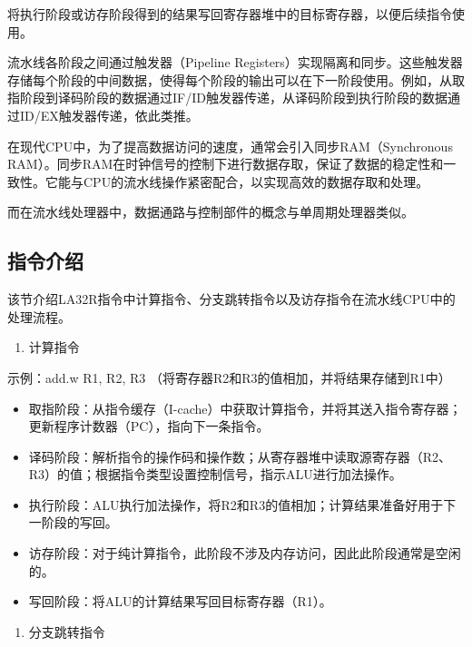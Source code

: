将执行阶段或访存阶段得到的结果写回寄存器堆中的目标寄存器，以便后续指令使用。

流水线各阶段之间通过触发器（Pipeline Registers）实现隔离和同步。这些触发器存储每个阶段的中间数据，使得每个阶段的输出可以在下一阶段使用。例如，从取指阶段到译码阶段的数据通过IF/ID触发器传递，从译码阶段到执行阶段的数据通过ID/EX触发器传递，依此类推。

在现代CPU中，为了提高数据访问的速度，通常会引入同步RAM（Synchronous RAM）。同步RAM在时钟信号的控制下进行数据存取，保证了数据的稳定性和一致性。它能与CPU的流水线操作紧密配合，以实现高效的数据存取和处理。

而在流水线处理器中，数据通路与控制部件的概念与单周期处理器类似。

\subsection{指令介绍}\label{sec:05-simple-cpu-009}

该节介绍LA32R指令中计算指令、分支跳转指令以及访存指令在流水线CPU中的处理流程。

\begin{enumerate}
\def\labelenumi{\arabic{enumi}.}
\tightlist
\item
  计算指令
\end{enumerate}

示例：add.w R1, R2, R3 （将寄存器R2和R3的值相加，并将结果存储到R1中）

\begin{itemize}
\item
  取指阶段：从指令缓存（I-cache）中获取计算指令，并将其送入指令寄存器；更新程序计数器（PC），指向下一条指令。
\item
  译码阶段：解析指令的操作码和操作数；从寄存器堆中读取源寄存器（R2、R3）的值；根据指令类型设置控制信号，指示ALU进行加法操作。
\item
  执行阶段：ALU执行加法操作，将R2和R3的值相加；计算结果准备好用于下一阶段的写回。
\item
  访存阶段：对于纯计算指令，此阶段不涉及内存访问，因此此阶段通常是空闲的。
\item
  写回阶段：将ALU的计算结果写回目标寄存器（R1）。
\end{itemize}

\begin{enumerate}
\def\labelenumi{\arabic{enumi}.}
\setcounter{enumi}{1}
\tightlist
\item
  分支跳转指令
\end{enumerate}

